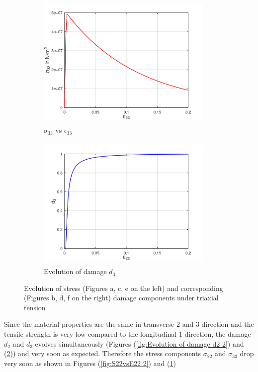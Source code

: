 \documentclass[12pt,a4paper,twoside,openright]{report}
\begin{document}
\begin{figure}[htbp!]\ContinuedFloat
     \begin{subfigure}{0.4\textwidth}
         \includegraphics[width=8.5cm,height=6.5cm]{24.S33vsE33.png}
         \caption{$\sigma_{33}$ vs $\epsilon_{33}$}
         \label{fig:S33vsE33}
     \end{subfigure}
     \hspace{1.5cm}
     \begin{subfigure}{0.4\textwidth}
         \includegraphics[width=8.5cm,height=6.5cm]{24.d2.png}
         \caption{Evolution of damage $d_{3}$}
         \label{fig:Evolution of damage d3}
     \end{subfigure}     
        \caption{Evolution of stress (Figures a, c, e on the left) and corresponding (Figures b, d, f on the right) damage components under triaxial tension}
        \label{fig:Evolution of damage under triaxial tension}     
\end{figure}
\FloatBarrier
Since the material properties are the same in transverse $2$ and $3$ direction and the tensile strength is very low compared to the longitudinal $1$ direction, the damage $d_{2}$ and $d_{3}$ evolves simultaneously (Figures (\ref{fig:Evolution of damage d2 2}) and (\ref{fig:Evolution of damage d3})) and very soon as expected. Therefore the stress components $\sigma_{22}$ and $\sigma_{33}$ drop very soon as shown in Figures (\ref{fig:S22vsE22 2}) and (\ref{fig:S33vsE33}) 
\end{document}
